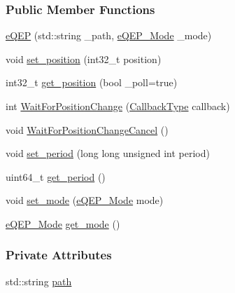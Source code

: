 \subsubsection*{Public Member Functions}
\begin{DoxyCompactItemize}
\item 
\hyperlink{class_hardware_1_1e_q_e_p_adc9ce642c8927e217afc3600a63002e5}{e\+Q\+E\+P} (std\+::string \+\_\+path, \hyperlink{class_hardware_1_1e_q_e_p_a3f97f26c64d49d6f2643a257b7249070}{e\+Q\+E\+P\+\_\+\+Mode} \+\_\+mode)
\item 
void \hyperlink{class_hardware_1_1e_q_e_p_aa55fc881377f4fc3396895de65ed9161}{set\+\_\+position} (int32\+\_\+t position)
\item 
int32\+\_\+t \hyperlink{class_hardware_1_1e_q_e_p_a3b06e47e9bb9a559e81427fe3e4f7cf9}{get\+\_\+position} (bool \+\_\+poll=true)
\item 
int \hyperlink{class_hardware_1_1e_q_e_p_a529f04118a9be4768c117c552ba34bd0}{Wait\+For\+Position\+Change} (\hyperlink{namespace_hardware_a5ba2e4bdfa2bbd8b551b1d5b2a0c61fd}{Callback\+Type} callback)
\item 
void \hyperlink{class_hardware_1_1e_q_e_p_aae8e9f7ac543384dac031fb81f092574}{Wait\+For\+Position\+Change\+Cancel} ()
\item 
void \hyperlink{class_hardware_1_1e_q_e_p_ab8b1babd8dc96f5052be96ed6e65e111}{set\+\_\+period} (long long unsigned int period)
\item 
uint64\+\_\+t \hyperlink{class_hardware_1_1e_q_e_p_a9ef725e955086baf06b9d8363318d5b3}{get\+\_\+period} ()
\item 
void \hyperlink{class_hardware_1_1e_q_e_p_a137d1fb0b0e5772487ece48254342294}{set\+\_\+mode} (\hyperlink{class_hardware_1_1e_q_e_p_a3f97f26c64d49d6f2643a257b7249070}{e\+Q\+E\+P\+\_\+\+Mode} mode)
\item 
\hyperlink{class_hardware_1_1e_q_e_p_a3f97f26c64d49d6f2643a257b7249070}{e\+Q\+E\+P\+\_\+\+Mode} \hyperlink{class_hardware_1_1e_q_e_p_a83f60cc0b6199828a629f54c0849ab16}{get\+\_\+mode} ()
\end{DoxyCompactItemize}
\subsubsection*{Private Attributes}
\begin{DoxyCompactItemize}
\item 
std\+::string \hyperlink{class_hardware_1_1e_q_e_p_a82718bc8478cde37f28fc685a859525e}{path}
\end{DoxyCompactItemize}
